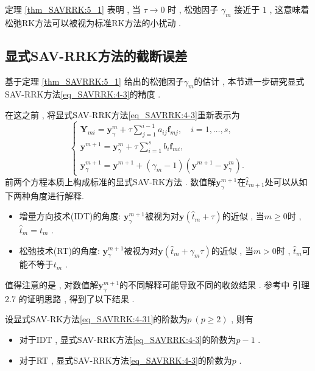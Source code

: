 \begin{remark}\label{rk_SAVRRK:5_1}
定理 \ref{thm_SAVRRK:5_1} 表明 , 当 $\tau\rightarrow 0$ 时 , 松弛因子 $\gamma_m$ 接近于 $1$ , 
这意味着松弛RK方法可以被视为标准RK方法的小扰动 . 
\end{remark}

\subsection{显式SAV-RRK方法的截断误差}
基于定理 \ref{thm_SAVRRK:5_1} 给出的松弛因子$\gamma_m$的估计 , 本节进一步研究显式SAV-RRK方法\eqref{eq_SAVRRK:4-3}的精度 . 

在这之前 , 将显式SAV-RRK方法\eqref{eq_SAVRRK:4-3}重新表示为
\begin{equation}
\left\{\begin{array}{l}
\bm{Y}_{m i}=\bm{y}_\gamma^m+\tau \sum\limits_{j=1}^{i-1} a_{i j} \bm{f}_{m j} , \quad i=1 , \ldots , s , \\
\bm{y}^{m+1}=\bm{y}_\gamma^m+\tau \sum\limits_{i=1}^s b_i \bm{f}_{m i} , \\
\bm{y}_\gamma^{m+1}=\bm{y}^{m+1}+\left(\gamma_m-1\right)\left(\bm{y}^{m+1}-\bm{y}_\gamma^m\right)  . 
\end{array}\right . \label{eq_SAVRRK:4-321}
\end{equation}
前两个方程本质上构成标准的显式SAV-RK方法 . 
\newpage
数值解$\bm{y}_\gamma^{m+1}$在$\hat{t}_{m+1}$处可以从如下两种角度进行解释\cite{ketchesonRelaxationRungeKutta2019}.%
\begin{itemize}
\item 增量方向技术(IDT)的角度: $\bm{y}_\gamma^{m+1}$被视为对$\bm{y}\left(\hat{t}_m+\tau\right)$的近似 , 当$m \geq 0$时 , $\hat{t}_m=t_m$ . 
\item 松弛技术(RT)的角度: $\bm{y}_\gamma^{m+1}$被视为对$\bm{y}\left(\hat{t}_m+\gamma_m \tau\right)$的近似 , 当$m>0$时 , $\hat{t}_m$可能不等于$t_m$ . 
\end{itemize}

值得注意的是 , 对数值解$\bm{y}_\gamma^{m+1}$的不同解释可能导致不同的收敛结果 . 
参考\citep{ranochaGeneralRelaxationMethods2020}中 引理 2.7 的证明思路 , 得到了以下结果 . 

\begin{theorem}\label{thm_SAVRRK:5_4}
设显式SAV-RK方法\eqref{eq_SAVRRK:4-31}的阶数为$p~(p \geq 2)$ , 则有
\begin{itemize}
\item 对于IDT , 显式SAV-RRK方法\eqref{eq_SAVRRK:4-3}的阶数为$p-1$ . 
\item 对于RT , 显式SAV-RRK方法\eqref{eq_SAVRRK:4-3}的阶数为$p$ . 
\end{itemize}
\end{theorem}


